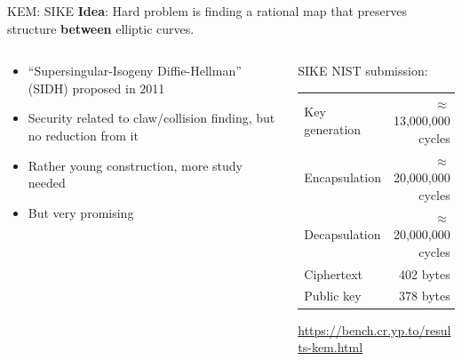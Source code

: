 \documentclass[xcolor=table,10pt,aspectratio=169]{beamer}
\begin{document}
\begin{frame}[label={sec:orgc93d758}]{KEM: SIKE}
\textbf{Idea}: Hard problem is finding a rational map that preserves structure \textbf{between} elliptic curves.

\begin{columns}[t]
\begin{column}{0.5\columnwidth}
\begin{itemize}
\item “Supersingular-Isogeny Diffie-Hellman” (SIDH) proposed in 2011
\item Security related to claw/collision finding, but no reduction from it
\item Rather young construction, more study needed
\item But very promising
\end{itemize}
\end{column}

\begin{column}{0.5\columnwidth}
SIKE NIST submission:

\begin{center}
\begin{tabular}{lr}
Key generation & \(\approx\) 13,000,000 cycles\\
Encapsulation & \(\approx\) 20,000,000 cycles\\
Decapsulation & \(\approx\) 20,000,000 cycles\\
Ciphertext & 402 bytes\\
Public key & 378 bytes\\
\end{tabular}

\end{center}

\small \url{https://bench.cr.yp.to/results-kem.html}
\end{column}
\end{columns}
\end{frame}
\end{document}
